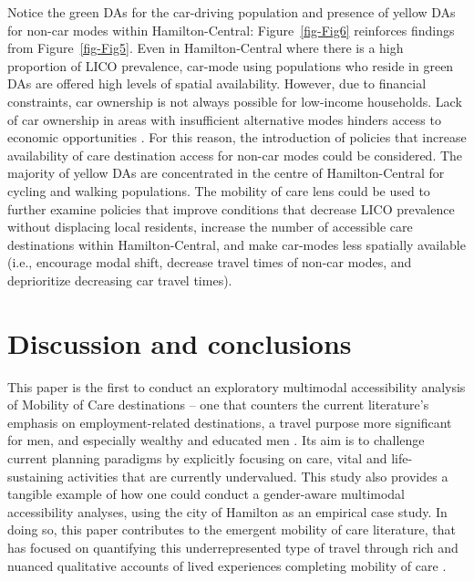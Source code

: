 \documentclass[
  authoryear,
  preprint,
  3p]{elsarticle}
\begin{document}
Notice the green DAs for the car-driving population and presence of
yellow DAs for non-car modes within Hamilton-Central:
Figure~\ref{fig-Fig6} reinforces findings from Figure~\ref{fig-Fig5}.
Even in Hamilton-Central where there is a high proportion of LICO
prevalence, car-mode using populations who reside in green DAs are
offered high levels of spatial availability. However, due to financial
constraints, car ownership is not always possible for low-income
households. Lack of car ownership in areas with insufficient alternative
modes hinders access to economic opportunities
\citep{morrisDoesLackingCar2020, kleinTransitionsOutCar2023}. For this
reason, the introduction of policies that increase availability of care
destination access for non-car modes could be considered. The majority
of yellow DAs are concentrated in the centre of Hamilton-Central for
cycling and walking populations. The mobility of care lens could be used
to further examine policies that improve conditions that decrease LICO
prevalence without displacing local residents, increase the number of
accessible care destinations within Hamilton-Central, and make car-modes
less spatially available (i.e., encourage modal shift, decrease travel
times of non-car modes, and deprioritize decreasing car travel times).

\section{Discussion and conclusions}\label{discussion-and-conclusions}

This paper is the first to conduct an exploratory multimodal
accessibility analysis of Mobility of Care destinations -- one that
counters the current literature's emphasis on employment-related
destinations, a travel purpose more significant for men, and especially
wealthy and educated men
\citep{lawWomenTransportNew1999, hansonGenderMobilityNew2010}. Its aim
is to challenge current planning paradigms by explicitly focusing on
care, vital and life-sustaining activities that are currently
undervalued. This study also provides a tangible example of how one
could conduct a gender-aware multimodal accessibility analyses, using
the city of Hamilton as an empirical case study. In doing so, this paper
contributes to the emergent mobility of care literature, that has
focused on quantifying this underrepresented type of travel
\citep{gomezvaroAccountingCareEveryday2023, murillomunarCaregiversMoveGender2023, ravensbergenExploratoryAnalysisMobility2022, sanchezdemadariagaMobilityCareIntroducing2013, sanchezdemadariagaMeasuringMobilitiesCare2019, shumanCanMobilityCare2023}
through rich and nuanced qualitative accounts of lived experiences
completing mobility of care
\citep{orjuelaReconsideringMobilityCare2023, ravensbergenVelomobilitiesCareLowcycling2020, sersliRidingAloneTogether2020}.
\end{document}
